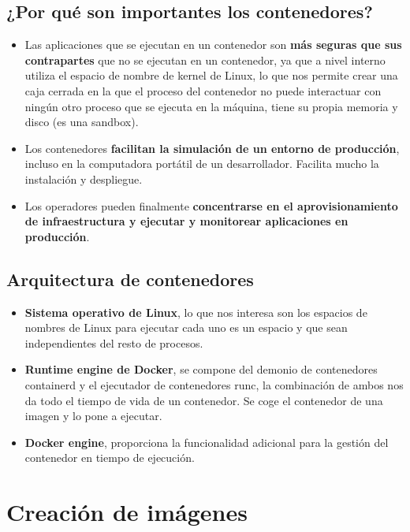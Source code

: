 \documentclass[12pt, twoside, openright]{report} %
\begin{document}
\subsection{¿Por qué son importantes los contenedores?}
\begin{itemize}
	\item Las aplicaciones que se ejecutan en un contenedor son \textbf{más seguras que sus contrapartes} que no se ejecutan en un contenedor, ya que a nivel interno utiliza el espacio de nombre de kernel de Linux, lo que nos permite crear una caja cerrada en la que el proceso del contenedor no puede interactuar con ningún otro proceso que se ejecuta en la máquina, tiene su propia memoria y disco (es una sandbox).

	\item Los contenedores \textbf{facilitan la simulación de un entorno de producción}, incluso en la computadora portátil de un desarrollador.
	      Facilita mucho la instalación y despliegue.

	\item Los operadores pueden finalmente \textbf{concentrarse en el aprovisionamiento de infraestructura y ejecutar y monitorear aplicaciones en producción}.
\end{itemize}

\subsection{Arquitectura de contenedores}

\begin{itemize}
	\item \textbf{Sistema operativo de Linux}, lo que nos interesa son los espacios de nombres de Linux para ejecutar cada uno es un espacio y que sean independientes del resto de procesos.
	\item \textbf{Runtime engine de Docker}, se compone del demonio de contenedores containerd y el ejecutador de contenedores runc, la combinación de ambos nos da todo el tiempo de vida de un contenedor. Se coge el contenedor de una imagen y lo pone a ejecutar.
	\item \textbf{Docker engine}, proporciona la funcionalidad adicional para la gestión del contenedor en tiempo de ejecución.
\end{itemize}
\pagebreak

\section{Creación de imágenes}
\end{document}

